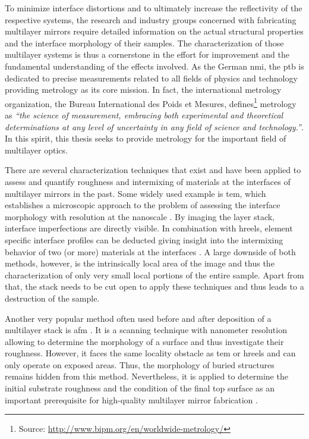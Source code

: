 To minimize interface distortions and to ultimately increase the reflectivity of the respective systems, the research and industry groups concerned with fabricating multilayer mirrors require detailed information on the actual structural properties and the interface morphology of their samples. The characterization of those multilayer systems is thus a cornerstone in the effort for improvement and the fundamental understanding of the effects involved. As the German \gls{nmi}, the \gls{ptb} is dedicated to precise measurements related to all fields of physics and technology providing metrology as its core mission. In fact, the international metrology organization, the Bureau International des Poids et Mesures, defines\footnote{Source: \url{http://www.bipm.org/en/worldwide-metrology/}} metrology as \emph{``the science of measurement, embracing both experimental and theoretical determinations at any level of uncertainty in any field of science and technology.''}. In this spirit, this thesis seeks to provide metrology for the important field of multilayer optics.

There are several characterization techniques that exist and have been applied to assess and quantify roughness and intermixing of materials at the interfaces of multilayer mirrors in the past. Some widely used example is \gls{tem}, which establishes a microscopic approach to the problem of assessing the interface morphology with resolution at the nanoscale \cite{stearns_thermally_1990, bajt_investigation_2001}. By imaging the layer stack, interface imperfections are directly visible. In combination with \gls{hreels}, element specific interface profiles can be deducted giving insight into the intermixing behavior of two (or more) materials at the interfaces \cite{egerton_electron_2011, prasciolu_thermal_2014}. A large downside of both methods, however, is the intrinsically local area of the image and thus the characterization of only very small local portions of the entire sample. Apart from that, the stack needs to be cut open to apply these techniques and thus leads to a destruction of the sample.

Another very popular method often used before and after deposition of a multilayer stack is \gls{afm} \cite{binnig_atomic_1986}. It is a scanning technique with nanometer resolution allowing to determine the morphology of a surface and thus investigate their roughness. However, it faces the same locality obstacle as \gls{tem} or \gls{hreels} and can only operate on exposed areas. Thus, the morphology of buried structures remains hidden from this method. Nevertheless, it is applied to determine the initial substrate roughness and the condition of the final top surface as an important prerequisite for high-quality multilayer mirror fabrication \cite{louis_progress_2000, bajt_investigation_2001}.

